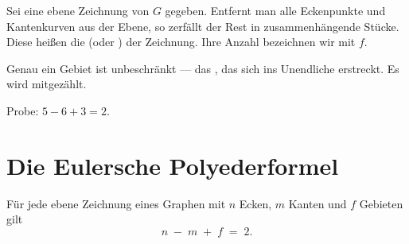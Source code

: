 \begin{definition}
Sei eine ebene Zeichnung von $G$ gegeben. Entfernt man alle Eckenpunkte und Kantenkurven aus der Ebene, so zerfällt der Rest in zusammenhängende Stücke. Diese heißen die  (oder ) der Zeichnung. Ihre Anzahl bezeichnen wir mit $f$.
\end{definition}

\begin{merksatz}
Genau ein Gebiet ist unbeschränkt --- das , das sich ins Unendliche erstreckt. Es wird mitgezählt.

\begin{center}
\end{center}

Probe: $5 - 6 + 3 = 2$.
\end{merksatz}

\section{Die Eulersche Polyederformel}

\begin{merksatz}
Für jede ebene Zeichnung eines  Graphen mit $n$ Ecken, $m$ Kanten und $f$ Gebieten gilt
\[ n \;-\; m \;+\; f \;=\; 2 . \]
\end{merksatz}

